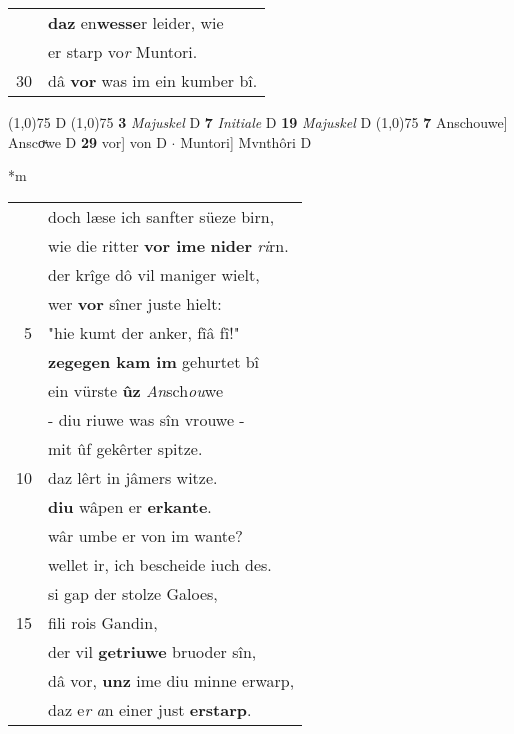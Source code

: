 \documentclass[8pt,a4paper,notitlepage]{article}
\begin{document}
\begin{table}[ht]
\begin{minipage}[t]{0.5\linewidth}
\begin{tabular}{rl}
 & \textbf{daz} en\textbf{wesse}r leider, wie\\ 
 & er starp vo\textit{r} Muntori.\\ 
30 & dâ \textbf{vor} was im ein kumber bî.\\ 
\end{tabular}
\scriptsize
\line(1,0){75} \newline
D \newline
\line(1,0){75} \newline
\textbf{3} \textit{Majuskel} D  \textbf{7} \textit{Initiale} D  \textbf{19} \textit{Majuskel} D  \newline
\line(1,0){75} \newline
\textbf{7} Anschouwe] Anscoͮwe D \textbf{29} vor] von D  $\cdot$ Muntori] Mvnthôri D \newline
\end{minipage}
\hspace{0.5cm}
\begin{minipage}[t]{0.5\linewidth}
\small
\begin{center}*m
\end{center}
\begin{tabular}{rl}
 & doch læse ich sanfter süeze birn,\\ 
 & wie die ritter \textbf{vor ime} \textbf{nider} \textit{ri}rn.\\ 
 & der krîge dô vil maniger wielt,\\ 
 & wer \textbf{vor} sîner juste hielt:\\ 
5 & "hie kumt der anker, fîâ fî!"\\ 
 & \textbf{zegegen kam im} gehurtet bî\\ 
 & ein vürste \textbf{ûz} \textit{An}sch\textit{ou}we\\ 
 & - diu riuwe was sîn vrouwe -\\ 
 & mit ûf gekêrter spitze.\\ 
10 & daz lêrt in jâmers witze.\\ 
 & \textbf{diu} wâpen er \textbf{erkante}.\\ 
 & wâr umbe er von im wante?\\ 
 & wellet ir, ich bescheide iuch des.\\ 
 & si gap der stolze Galoes,\\ 
15 & fili rois Gandin,\\ 
 & der vil \textbf{getriuwe} bruoder sîn,\\ 
 & dâ vor, \textbf{unz} ime diu minne erwarp,\\ 
 & daz e\textit{r} \textit{a}n einer just \textbf{erstarp}.\\ 

\end{tabular}
\end{minipage}
\end{table}
\end{document}
